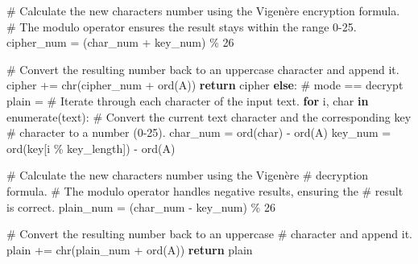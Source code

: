 \documentclass[
  nswissgerman,
  a4paper,
  DIV=11,
  numbers=noendperiod,
  ngerman]{scrreprt}
\newenvironment{Shaded}{\begin{snugshade}}{\end{snugshade}}
\newcommand{\BuiltInTok}[1]{\textcolor[rgb]{0.00,0.23,0.31}{#1}}
\newcommand{\CommentTok}[1]{\textcolor[rgb]{0.37,0.37,0.37}{#1}}
\newcommand{\ControlFlowTok}[1]{\textcolor[rgb]{0.00,0.23,0.31}{\textbf{#1}}}
\newcommand{\DecValTok}[1]{\textcolor[rgb]{0.68,0.00,0.00}{#1}}
\newcommand{\KeywordTok}[1]{\textcolor[rgb]{0.00,0.23,0.31}{\textbf{#1}}}
\newcommand{\NormalTok}[1]{\textcolor[rgb]{0.00,0.23,0.31}{#1}}
\newcommand{\OperatorTok}[1]{\textcolor[rgb]{0.37,0.37,0.37}{#1}}
\newcommand{\StringTok}[1]{\textcolor[rgb]{0.13,0.47,0.30}{#1}}
\begin{document}
\begin{Shaded}
\begin{Highlighting}[numbers=left,,]
           \CommentTok{\# Calculate the new character\textquotesingle{}s number using the Vigenère encryption formula.}
           \CommentTok{\# The modulo operator ensures the result stays within the range 0{-}25.}
\NormalTok{           cipher\_num }\OperatorTok{=}\NormalTok{ (char\_num }\OperatorTok{+}\NormalTok{ key\_num) }\OperatorTok{\%} \DecValTok{26}
           
           \CommentTok{\# Convert the resulting number back to an uppercase character and append it.}
\NormalTok{           cipher }\OperatorTok{+=} \BuiltInTok{chr}\NormalTok{(cipher\_num }\OperatorTok{+} \BuiltInTok{ord}\NormalTok{(}\StringTok{\textquotesingle{}A\textquotesingle{}}\NormalTok{))}
       \ControlFlowTok{return}\NormalTok{ cipher  }
    \ControlFlowTok{else}\NormalTok{:  }\CommentTok{\# mode == \textquotesingle{}decrypt\textquotesingle{}}
\NormalTok{        plain }\OperatorTok{=} \StringTok{\textquotesingle{}\textquotesingle{}}
        \CommentTok{\# Iterate through each character of the input text.}
        \ControlFlowTok{for}\NormalTok{ i, char }\KeywordTok{in} \BuiltInTok{enumerate}\NormalTok{(text):}
            \CommentTok{\# Convert the current text character and the corresponding key }
            \CommentTok{\# character to a number (0{-}25).}
\NormalTok{            char\_num }\OperatorTok{=} \BuiltInTok{ord}\NormalTok{(char) }\OperatorTok{{-}} \BuiltInTok{ord}\NormalTok{(}\StringTok{\textquotesingle{}A\textquotesingle{}}\NormalTok{)}
\NormalTok{            key\_num }\OperatorTok{=} \BuiltInTok{ord}\NormalTok{(key[i }\OperatorTok{\%}\NormalTok{ key\_length]) }\OperatorTok{{-}} \BuiltInTok{ord}\NormalTok{(}\StringTok{\textquotesingle{}A\textquotesingle{}}\NormalTok{)}
            
            \CommentTok{\# Calculate the new character\textquotesingle{}s number using the Vigenère }
            \CommentTok{\# decryption formula.}
            \CommentTok{\# The modulo operator handles negative results, ensuring the }
            \CommentTok{\# result is correct.}
\NormalTok{            plain\_num }\OperatorTok{=}\NormalTok{ (char\_num }\OperatorTok{{-}}\NormalTok{ key\_num) }\OperatorTok{\%} \DecValTok{26}
            
            \CommentTok{\# Convert the resulting number back to an uppercase }
            \CommentTok{\# character and append it.}
\NormalTok{            plain }\OperatorTok{+=} \BuiltInTok{chr}\NormalTok{(plain\_num }\OperatorTok{+} \BuiltInTok{ord}\NormalTok{(}\StringTok{\textquotesingle{}A\textquotesingle{}}\NormalTok{))}
        \ControlFlowTok{return}\NormalTok{ plain}
\end{Highlighting}
\end{Shaded}
\end{document}
